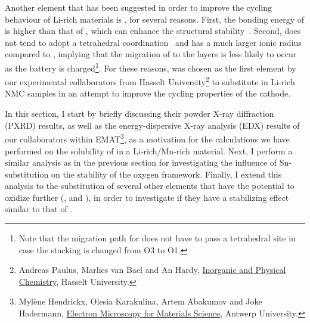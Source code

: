 \begin{refsection}
Another element that has been suggested in order to improve the cycling 
behaviour of Li-rich materials is , for several reasons. First, 
the bonding energy of  is higher than that of , which can 
enhance the structural stability~\cite{Qiao2015}. Second,  does 
not tend to adopt a tetrahedral coordination~\cite{Sathiya2013} and has a much 
larger ionic radius compared to , implying that the migration of 
 to the  layers is less likely to occur as the battery is 
charged\footnote{Note that the migration path for  does not have 
to pass a tetrahedral site in case the stacking is changed from O3 to O1.}. 
For these reasons,  was chosen as the first element by our 
experimental collaborators from Hasselt University\footnote{Andreas Paulus, 
Marlies van Bael and An Hardy, \href{https://www.uhasselt.be/UH/IMO/Visit-the-groups/Inorganic-and-physical-chemistry-(IPC).html}{Inorganic and Physical Chemistry}, Hasselt University.} to substitute in 
Li-rich NMC samples in an attempt to improve the cycling properties of the 
cathode. 

In this section, I start by briefly discussing their powder X-ray diffraction (PXRD) results, as well as 
the energy-dispersive X-ray analysis (EDX) results of our collaborators within EMAT\footnote{Myl\`ene Hendrickx, Olesia 
Karakulina, Artem Abakumov and Joke Hadermann, \href{https://www.uantwerpen.be/en/research-groups/emat/}{Electron Microscopy for Materials 
Science}, Antwerp University.}, as a motivation for the 
calculations we have performed on the solubility of  in a 
Li-rich/Mn-rich material. Next, I perform a similar analysis as in the 
previous section for investigating the influence of Sn-substitution on the 
stability of the oxygen framework. Finally, I extend this analysis to the 
substitution of several other elements that have the potential to oxidize 
further (,  and ), in order to investigate if they have a 
stabilizing effect similar to that of .  

 

\end{refsection}
